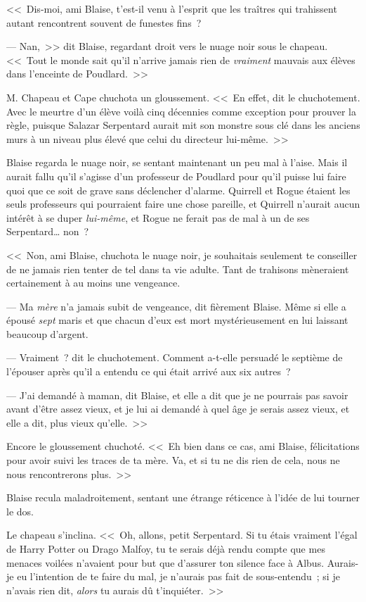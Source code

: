 <<~Dis-moi, ami Blaise, t'est-il venu à l'esprit que les traîtres qui trahissent autant rencontrent souvent de funestes fins~?

--- Nan,~>> dit Blaise, regardant droit vers le nuage noir sous le chapeau. <<~Tout le monde sait qu'il n'arrive jamais rien de \emph{vraiment} mauvais aux élèves dans l'enceinte de Poudlard.~>>

M. Chapeau et Cape chuchota un gloussement. <<~En effet, dit le chuchotement. Avec le meurtre d'un élève voilà cinq décennies comme exception pour prouver la règle, puisque Salazar Serpentard aurait mit son monstre sous clé dans les anciens murs à un niveau plus élevé que celui du directeur lui-même.~>>

Blaise regarda le nuage noir, se sentant maintenant un peu mal à l'aise. Mais il aurait fallu qu'il s'agisse d'un professeur de Poudlard pour qu'il puisse lui faire quoi que ce soit de grave sans déclencher d'alarme. Quirrell et Rogue étaient les seuls professeurs qui pourraient faire une chose pareille, et Quirrell n'aurait aucun intérêt à se duper \emph{lui-même}, et Rogue ne ferait pas de mal à un de ses Serpentard… non~?

<<~Non, ami Blaise, chuchota le nuage noir, je souhaitais seulement te conseiller de ne jamais rien tenter de tel dans ta vie adulte. Tant de trahisons mèneraient certainement à au moins une vengeance.

--- Ma \emph{mère} n'a jamais subit de vengeance, dit fièrement Blaise. Même si elle a épousé \emph{sept} maris et que chacun d'eux est mort mystérieusement en lui laissant beaucoup d'argent.

--- Vraiment~? dit le chuchotement. Comment a-t-elle persuadé le septième de l'épouser après qu'il a entendu ce qui était arrivé aux six autres~?

--- J'ai demandé à maman, dit Blaise, et elle a dit que je ne pourrais pas savoir avant d'être assez vieux, et je lui ai demandé à quel âge je serais assez vieux, et elle a dit, plus vieux qu'elle.~>>

Encore le gloussement chuchoté. <<~Eh bien dans ce cas, ami Blaise, félicitations pour avoir suivi les traces de ta mère. Va, et si tu ne dis rien de cela, nous ne nous rencontrerons plus.~>>

Blaise recula maladroitement, sentant une étrange réticence à l'idée de lui tourner le dos.

Le chapeau s'inclina. <<~Oh, allons, petit Serpentard. Si tu étais vraiment l'égal de Harry Potter ou Drago Malfoy, tu te serais déjà rendu compte que mes menaces voilées n'avaient pour but que d'assurer ton silence face à Albus. Aurais-je eu l'intention de te faire du mal, je n'aurais pas fait de sous-entendu~; si je n'avais rien dit, \emph{alors} tu aurais dû t'inquiéter.~>>


